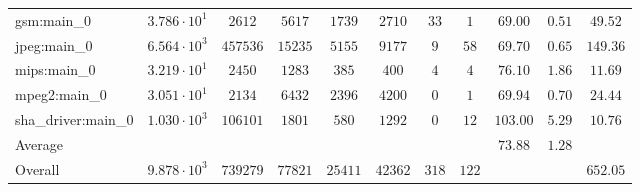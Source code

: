 \begin{tabular}{|l|c|c|c|c|c|c|c|c|c|c|}
gsm:main\_0             & $ 3.786 \cdot 10^{1} $ & $ 2612   $ & $ 5617  $ & $ 1739  $ & $ 2710  $ & $ 33  $ & $ 1   $ & $ 69.00       $ & $ 0.51    $ & $ 49.52   $ \\
jpeg:main\_0            & $ 6.564 \cdot 10^{3} $ & $ 457536 $ & $ 15235 $ & $ 5155  $ & $ 9177  $ & $ 9   $ & $ 58  $ & $ 69.70       $ & $ 0.65    $ & $ 149.36  $ \\
mips:main\_0            & $ 3.219 \cdot 10^{1} $ & $ 2450   $ & $ 1283  $ & $ 385   $ & $ 400   $ & $ 4   $ & $ 4   $ & $ 76.10       $ & $ 1.86    $ & $ 11.69   $ \\
mpeg2:main\_0           & $ 3.051 \cdot 10^{1} $ & $ 2134   $ & $ 6432  $ & $ 2396  $ & $ 4200  $ & $ 0   $ & $ 1   $ & $ 69.94       $ & $ 0.70    $ & $ 24.44   $ \\
sha\_driver:main\_0     & $ 1.030 \cdot 10^{3} $ & $ 106101 $ & $ 1801  $ & $ 580   $ & $ 1292  $ & $ 0   $ & $ 12  $ & $ 103.00      $ & $ 5.29    $ & $ 10.76   $ \\
\hline
Average                 & $                    $ & $        $ & $       $ & $       $ & $       $ & $     $ & $     $ & $ 73.88       $ & $ 1.28    $ & $         $ \\
\hline
Overall                 & $ 9.878 \cdot 10^{3} $ & $ 739279 $ & $ 77821 $ & $ 25411 $ & $ 42362 $ & $ 318 $ & $ 122 $ & $             $ & $         $ & $ 652.05  $ \\
\hline
\end{tabular}
